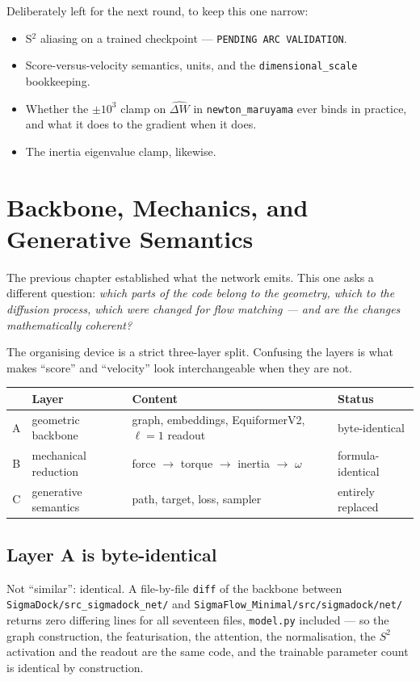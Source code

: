 \documentclass[11pt,a4paper]{report}
\theoremstyle{definition}
\theoremstyle{remark}
\newcommand{\file}[1]{\texttt{#1}}
\newcommand{\pyfunc}[1]{\texttt{#1}}
\begin{document}
Deliberately left for the next round, to keep this one narrow:
\begin{itemize}
\item S$^2$ aliasing on a trained checkpoint --- \texttt{PENDING ARC VALIDATION}.
\item Score-versus-velocity semantics, units, and the
      \texttt{dimensional\_scale} bookkeeping.
\item Whether the $\pm10^3$ clamp on $\widehat{\Delta W}$ in
      \pyfunc{newton\_maruyama} ever binds in practice, and what it does to
      the gradient when it does.
\item The inertia eigenvalue clamp, likewise.
\end{itemize}


\chapter{Backbone, Mechanics, and Generative Semantics}
\label{chap:engine-swap}

The previous chapter established what the network emits. This one asks a
different question: \emph{which parts of the code belong to the geometry,
which to the diffusion process, which were changed for flow matching --- and
are the changes mathematically coherent?}

The organising device is a strict three-layer split. Confusing the layers is
what makes ``score'' and ``velocity'' look interchangeable when they are not.

\begin{center}
\begin{tabular}{clll}
\toprule
& Layer & Content & Status \\
\midrule
A & geometric backbone & graph, embeddings, EquiformerV2, $\ell=1$ readout & byte-identical \\
B & mechanical reduction & force $\to$ torque $\to$ inertia $\to$ $\omega$ & formula-identical \\
C & generative semantics & path, target, loss, sampler & entirely replaced \\
\bottomrule
\end{tabular}
\end{center}

\section{Layer A is byte-identical}
\label{sec:engine-layer-a}

Not ``similar'': identical. A file-by-file \texttt{diff} of the backbone
between \file{SigmaDock/src\_sigmadock\_net/} and
\file{SigmaFlow\_Minimal/src/sigmadock/net/} returns zero differing lines for
all seventeen files, \file{model.py} included --- so the graph construction,
the featurisation, the attention, the normalisation, the $S^2$ activation and
the readout are the same code, and the trainable parameter count is
identical by construction.
\end{document}
